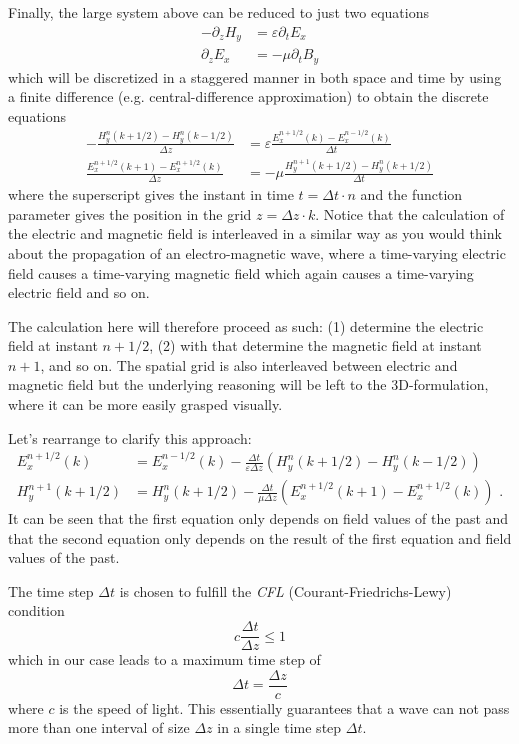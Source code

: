 \documentclass[]{report}
\begin{document}
Finally, the large system above can be reduced to just two equations
\begin{align}
	-\partial_z H_y &= \varepsilon \partial_t E_x \\
	\partial_z E_x  &= -\mu \partial_t B_y
\end{align}
which will be discretized in a staggered manner in both space and time by using a finite difference (e.g. central-difference approximation)
to obtain the discrete equations
\begin{align}
	-\frac{H_y^{n}(k+1/2) - H_y^n(k-1/2)}{\Delta z} &= \varepsilon \frac{E_x^{n+1/2}(k)-E_x^{n-1/2}(k)}{\Delta t} \\
	\frac{E_x^{n+1/2}(k+1)-E_x^{n+1/2}(k)}{\Delta z}  &= -\mu \frac{H_y^{n+1}(k+1/2)-H_y^{n}(k+1/2)}{\Delta t}
\end{align}
where the superscript gives the instant in time \( t = \Delta t \cdot n \) and the function parameter gives the position in the grid \( z = \Delta z \cdot k \). Notice that the calculation of the electric and magnetic field is interleaved in a similar way as you would think about the propagation of an electro-magnetic wave, where a time-varying electric field causes a time-varying magnetic field which again causes a time-varying electric field and so on.

The calculation here will therefore proceed as such: (1) determine the electric field at instant \( n+1/2 \), (2) with that determine the magnetic field at instant \( n+1 \), and so on. The spatial grid is also interleaved between electric and magnetic field but the underlying reasoning will be left to the 3D-formulation, where it can be more easily grasped visually.

Let's rearrange to clarify this approach:
\begin{align}
	E_x^{n+1/2}(k) &= E_x^{n-1/2}(k) - \frac{\Delta t}{\varepsilon \Delta z}\left( H_y^n(k+1/2) - H_y^n(k-1/2) \right) \\
	H_y^{n+1}(k+1/2) &= H_y^n(k+1/2) - \frac{\Delta t}{\mu \Delta z}\left( E_x^{n+1/2}(k+1) - E_x^{n+1/2}(k) \right) \text{ .}
\end{align}
It can be seen that the first equation only depends on field values of the past and that the second equation only depends on the result of the first equation and field values of the past.

The time step \( \Delta t \) is chosen to fulfill the \textit{CFL} (Courant-Friedrichs-Lewy) condition
\begin{equation}
	c \frac{\Delta t}{\Delta z} \leq 1
\end{equation}
which in our case leads to a maximum time step of
\begin{equation}
	\Delta t = \frac{\Delta z}{c}
\end{equation}
where \( c \) is the speed of light. This essentially guarantees that a wave can not pass more than one interval of size \( \Delta z \) in a single time step \( \Delta t \).
\end{document}
